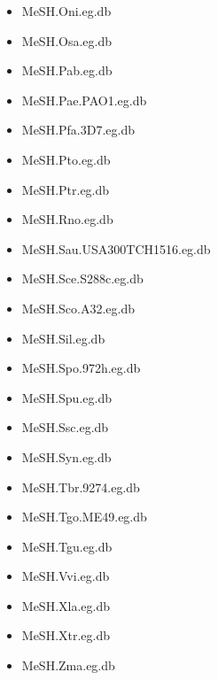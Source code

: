 \documentclass[margin,line,10pt]{res}
\newenvironment{list1}{
  \begin{list}{\ding{113}}{%
      \setlength{\itemsep}{0in}
      \setlength{\parsep}{0in} \setlength{\parskip}{0in}
      \setlength{\topsep}{0in} \setlength{\partopsep}{0in} 
      \setlength{\leftmargin}{0.17in}}}{\end{list}}
\begin{document}
\begin{resume}
\begin{list1}
\begin{multicols}{2}
\begin{itemize}
\item MeSH.Oni.eg.db 
\item MeSH.Osa.eg.db 
\item MeSH.Pab.eg.db 
\item MeSH.Pae.PAO1.eg.db 
\item MeSH.Pfa.3D7.eg.db
\item MeSH.Pto.eg.db 
\item MeSH.Ptr.eg.db 
\item MeSH.Rno.eg.db  
\item MeSH.Sau.USA300TCH1516.eg.db 
\item MeSH.Sce.S288c.eg.db 
\item MeSH.Sco.A32.eg.db 
\item MeSH.Sil.eg.db 
\item MeSH.Spo.972h.eg.db
\item MeSH.Spu.eg.db
\item MeSH.Ssc.eg.db 
\item MeSH.Syn.eg.db 
\item MeSH.Tbr.9274.eg.db 
\item MeSH.Tgo.ME49.eg.db
\item MeSH.Tgu.eg.db 
\item MeSH.Vvi.eg.db 
\item MeSH.Xla.eg.db  
\item MeSH.Xtr.eg.db 
\item MeSH.Zma.eg.db
\end{itemize}
\end{multicols}




\end{list1}
\end{resume}
\end{document}
